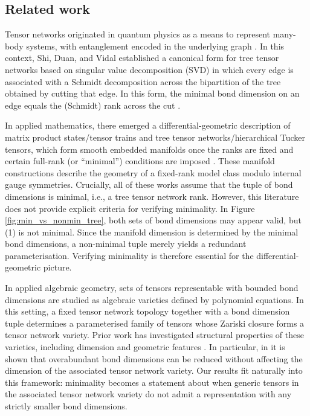\documentclass{amsart}
\theoremstyle{plain}
\theoremstyle{definition}
\theoremstyle{remark}
\begin{document}
\subsection{Related work}\label{sec:lit_review}

Tensor networks originated in quantum physics as a means to represent many-body systems, with entanglement encoded in the underlying graph \cite{Verstraete01032008, ShiDuanVidal2006, evenblyTensorNetworkStates2011, Orus2014}. In this context, Shi, Duan, and Vidal established a canonical form for tree tensor networks based on singular value decomposition (SVD) in which every edge is associated with a Schmidt decomposition across the bipartition of the tree obtained by cutting that edge. In this form, the minimal bond dimension on an edge equals the (Schmidt) rank across the cut \cite{ShiDuanVidal2006}. 

In applied mathematics, there emerged a differential-geometric description of matrix product states/tensor trains and tree tensor networks/hierarchical Tucker tensors, which form smooth embedded manifolds once the ranks are fixed and certain full-rank (or ``minimal'') conditions are imposed \cite{holtzManifoldsTensorsFixed2012, USCHMAJEW2013133, Haegeman2014GeometryMPS}. These manifold constructions describe the geometry of a fixed-rank model class modulo internal gauge symmetries. Crucially, all of these works assume that the tuple of bond dimensions is minimal, i.e., a tree tensor network rank. However, this literature does not provide explicit criteria for verifying minimality. In Figure \ref{fig:min_vs_nonmin_tree}, both sets of bond dimensions may appear valid, but (1) is not minimal. Since the manifold dimension is determined by the minimal bond dimensions, a non-minimal tuple merely yields a redundant parameterisation. Verifying minimality is therefore essential for the differential-geometric picture.

In applied algebraic geometry, sets of tensors representable with bounded bond dimensions are studied as algebraic varieties defined by polynomial equations. In this setting, a fixed tensor network topology together with a bond dimension tuple determines a parameterised family of tensors whose Zariski closure forms a tensor network variety. Prior work has investigated structural properties of these varieties, including dimension and geometric features \cite{landsbergGeometryTensorNetwork2012, buczynskaHackbuschConjectureTensor2015, limandye, bernardiDimensionTensorNetwork2023}. In particular, in \cite{bernardiDimensionTensorNetwork2023} it is shown that overabundant bond dimensions can be reduced without affecting the dimension of the associated tensor network variety. Our results fit naturally into this framework: minimality becomes a statement about when generic tensors in the associated tensor network variety do not admit a representation with any strictly smaller bond dimensions. 
\end{document}
